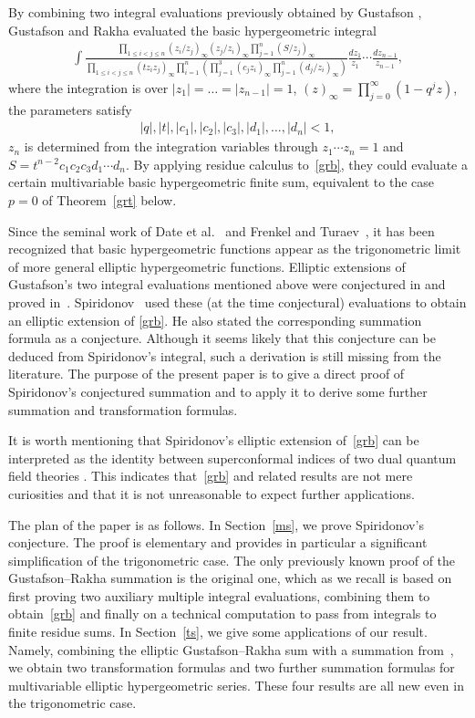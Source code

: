 \documentclass[pdftex]{sigma}
\numberwithin{equation}{section}
\begin{document}
By combining two integral evaluations previously obtained by Gustafson \cite{gu},
Gustafson and Rakha \cite{gr} evaluated the basic hypergeometric integral
\begin{gather}\label{grb}\int\frac{\prod\limits_{1\leq i< j\leq n}(z_i/z_j)_\infty(z_j/z_i)_\infty\prod\limits_{j=1}^n(S/z_j)_\infty}
{\prod\limits_{1\leq i<j\leq n}(tz_iz_j)_\infty\prod\limits_{i=1}^n\left(\prod\limits_{j=1}^3(c_jz_i)_\infty\prod\limits_{j=1}^n(d_j/z_i)_\infty\right)}\frac{dz_1}{z_1}\dotsm\frac{dz_{n-1}}{z_{n-1}}, \end{gather}
where the integration is over $|z_1|=\dots=|z_{n-1}|=1$, $(z)_\infty=\prod\limits_{j=0}^\infty(1-q^j z)$, the parameters satisfy
\begin{gather*}|q|, |t|, |c_1|, |c_2|, |c_3|, |d_1|, \dots, |d_n|<1, \end{gather*}
$z_n$ is determined from the integration variables through $z_1\dotsm z_n=1$ and $S=t^{n-2}c_1c_2c_3d_1\dotsm d_n$. By applying residue calculus to~\eqref{grb}, they could evaluate a certain multivariable basic hypergeometric f\/inite sum, equivalent to the case $p=0$ of Theorem~\ref{grt} below.

Since the seminal work of Date et al.~\cite{d} and Frenkel and Turaev~\cite{ft}, it has been recognized that basic hypergeometric functions appear as the trigonometric limit of more general elliptic hypergeometric functions. Elliptic extensions of Gustafson's two integral evaluations mentioned above were conjectured in \cite{sp, ds} and proved in~\cite{ra}. Spiridonov~\cite{sp} used these (at the time conjectural) evaluations to obtain an elliptic extension of \eqref{grb}. He also stated the corresponding summation formula as a conjecture. Although it seems likely that this conjecture can be deduced from Spiridonov's integral, such a derivation is still missing from the literature. The purpose of the present paper is to give a direct proof of Spiridonov's conjectured summation and to apply it to derive some further summation and transformation formulas.

It is worth mentioning that Spiridonov's elliptic extension of~\eqref{grb} can be interpreted as the identity between superconformal indices of two dual quantum f\/ield theories \cite[Sections~12.1.2--12.1.3]{sv}. This indicates that~\eqref{grb} and related results are not mere curiosities and that it is not unreasonable to expect further applications.

The plan of the paper is as follows. In Section~\ref{ms}, we prove Spiridonov's conjecture. The proof is elementary and provides in particular a signif\/icant simplif\/ication of the trigonometric case. The only previously known proof of the Gustafson--Rakha summation is the original one, which as we recall is based on f\/irst proving two auxiliary multiple integral evaluations, combining them to obtain~\eqref{grb} and f\/inally on a technical computation to pass from integrals to f\/inite residue sums. In Section~\ref{ts}, we give some applications of our result. Namely, combining the elliptic Gustafson--Rakha sum with a summation from~\cite{rs}, we obtain two transformation formulas and two further summation formulas for multivariable elliptic hypergeometric series. These four results are all new even in the trigonometric case.
\end{document}
